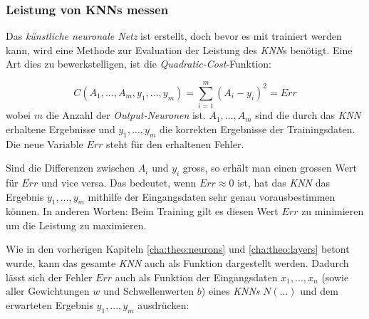 
\subsubsection{Leistung von KNNs messen}\label{cha:theo:cost}

Das \textit{künstliche neuronale Netz} ist erstellt, doch bevor es mit trainiert werden kann, wird eine Methode zur Evaluation der Leistung des \textit{KNN}s benötigt. Eine Art dies zu bewerkstelligen, ist die \textit{Quadratic-Cost}-Funktion:

\begin{equation}\label{eq:cost}
C(A_1,...,A_m,y_1,...,y_m)=\sum_{i=1}^{m}\left(A_i-y_i\right)^2=Err
\end{equation}
wobei $m$ die Anzahl der \textit{Output-Neuronen} ist. $A_1,...,A_m$ sind die durch das \textit{KNN} erhaltene Ergebnisse und $y_1,...,y_m$ die korrekten Ergebnisse der Trainingsdaten. Die neue Variable $Err$ steht für den erhaltenen Fehler. %

Sind die Differenzen zwischen $A_i$ und $y_i$ gross, so erhält man einen grossen Wert für $Err$ und vice versa. Das bedeutet, wenn $Err \approx 0$ ist, hat das \textit{KNN} das Ergebnis $y_1,...,y_m$ mithilfe der Eingangsdaten sehr genau vorausbestimmen können. In anderen Worten: Beim Training gilt es diesen Wert $Err$ zu minimieren um die Leistung zu maximieren.

Wie in den vorherigen Kapiteln \ref{cha:theo:neurons} und \ref{cha:theo:layers} betont wurde, kann das gesamte \textit{KNN} auch als Funktion dargestellt werden. Dadurch lässt sich der Fehler $Err$ auch als Funktion der Eingangsdaten $x_1,...,x_n$ (sowie aller Gewichtungen $w$ und Schwellenwerten $b$) eines \textit{KNNs} $N(...)$ und dem erwarteten Ergebnis $y_1,...,y_m$  ausdrücken:


